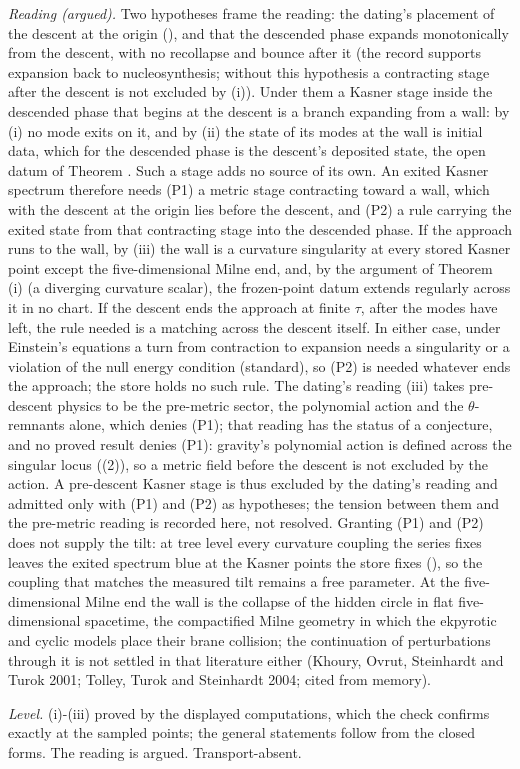 \emph{Reading (argued).} Two hypotheses frame the reading: the dating's placement of the descent at the origin (), and that the descended phase expands monotonically from the descent, with no recollapse and bounce after it (the record supports expansion back to nucleosynthesis; without this hypothesis a contracting stage after the descent is not excluded by (i)). Under them a Kasner stage inside the descended phase that begins at the descent is a branch expanding from a wall: by (i) no mode exits on it, and by (ii) the state of its modes at the wall is initial data, which for the descended phase is the descent's deposited state, the open datum of Theorem . Such a stage adds no source of its own. An exited Kasner spectrum therefore needs (P1) a metric stage contracting toward a wall, which with the descent at the origin lies before the descent, and (P2) a rule carrying the exited state from that contracting stage into the descended phase. If the approach runs to the wall, by (iii) the wall is a curvature singularity at every stored Kasner point except the five-dimensional Milne end, and, by the argument of Theorem (i) (a diverging curvature scalar), the frozen-point datum extends regularly across it in no chart. If the descent ends the approach at finite $\tau$, after the modes have left, the rule needed is a matching across the descent itself. In either case, under Einstein's equations a turn from contraction to expansion needs a singularity or a violation of the null energy condition (standard), so (P2) is needed whatever ends the approach; the store holds no such rule. The dating's reading (iii) takes pre-descent physics to be the pre-metric sector, the polynomial action and the $\theta$-remnants alone, which denies (P1); that reading has the status of a conjecture, and no proved result denies (P1): gravity's polynomial action is defined across the singular locus ((2)), so a metric field before the descent is not excluded by the action. A pre-descent Kasner stage is thus excluded by the dating's reading and admitted only with (P1) and (P2) as hypotheses; the tension between them and the pre-metric reading is recorded here, not resolved. Granting (P1) and (P2) does not supply the tilt: at tree level every curvature coupling the series fixes leaves the exited spectrum blue at the Kasner points the store fixes (), so the coupling that matches the measured tilt remains a free parameter. At the five-dimensional Milne end the wall is the collapse of the hidden circle in flat five-dimensional spacetime, the compactified Milne geometry in which the ekpyrotic and cyclic models place their brane collision; the continuation of perturbations through it is not settled in that literature either (Khoury, Ovrut, Steinhardt and Turok 2001; Tolley, Turok and Steinhardt 2004; cited from memory).

\emph{Level.} (i)-(iii) proved by the displayed computations, which the check confirms exactly at the sampled points; the general statements follow from the closed forms. The reading is argued. Transport-absent.
